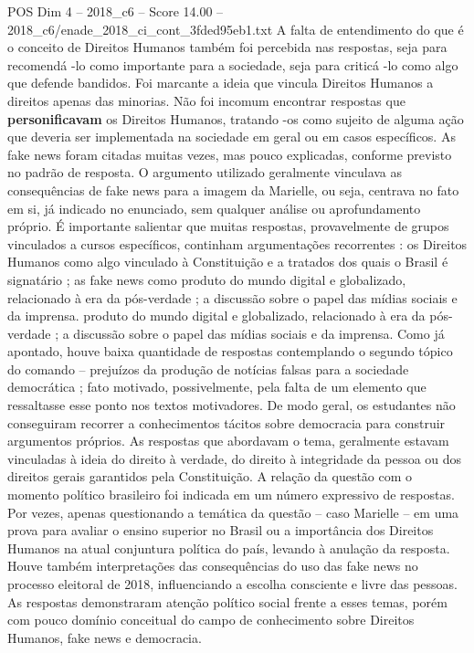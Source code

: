 \begin{textsample}{POS Dim 4 – 2018\_c6 – Score 14.00 – 2018\_c6/enade\_2018\_ci\_cont\_3fded95eb1.txt}
A falta de entendimento do que é o conceito de Direitos Humanos também foi percebida nas respostas, seja para recomendá -lo como importante para a sociedade, seja para criticá -lo como algo que defende bandidos.
Foi marcante a ideia que vincula Direitos Humanos a direitos apenas das minorias.
Não foi incomum encontrar respostas que \textbf{personificavam} os Direitos Humanos, tratando -os como sujeito de alguma ação que deveria ser implementada na sociedade em geral ou em casos específicos.
As fake news foram citadas muitas vezes, mas pouco explicadas, conforme previsto no padrão de resposta.
O argumento utilizado geralmente vinculava as consequências de fake news para a imagem da Marielle, ou seja, centrava no fato em si, já indicado no enunciado, sem qualquer análise ou aprofundamento próprio.
É importante salientar que muitas respostas, provavelmente de grupos vinculados a cursos específicos, continham argumentações recorrentes : os Direitos Humanos como algo vinculado à Constituição e a tratados dos quais o Brasil é signatário ; as fake news como produto do mundo digital e globalizado, relacionado à era da pós-verdade ; a discussão sobre o papel das mídias sociais e da imprensa. produto do mundo digital e globalizado, relacionado à era da pós-verdade ; a discussão sobre o papel das mídias sociais e da imprensa.
Como já apontado, houve baixa quantidade de respostas contemplando o segundo tópico do comando – prejuízos da produção de notícias falsas para a sociedade democrática ; fato motivado, possivelmente, pela falta de um elemento que ressaltasse esse ponto nos textos motivadores.
De modo geral, os estudantes não conseguiram recorrer a conhecimentos tácitos sobre democracia para construir argumentos próprios.
As respostas que abordavam o tema, geralmente estavam vinculadas à ideia do direito à verdade, do direito à integridade da pessoa ou dos direitos gerais garantidos pela Constituição.
A relação da questão com o momento político brasileiro foi indicada em um número expressivo de respostas.
Por vezes, apenas questionando a temática da questão – caso Marielle – em uma prova para avaliar o ensino superior no Brasil ou a importância dos Direitos Humanos na atual conjuntura política do país, levando à anulação da resposta.
Houve também interpretações das consequências do uso das fake news no processo eleitoral de 2018, influenciando a escolha consciente e livre das pessoas.
As respostas demonstraram atenção político social frente a esses temas, porém com pouco domínio conceitual do campo de conhecimento sobre Direitos Humanos, fake news e democracia.

\end{textsample}
